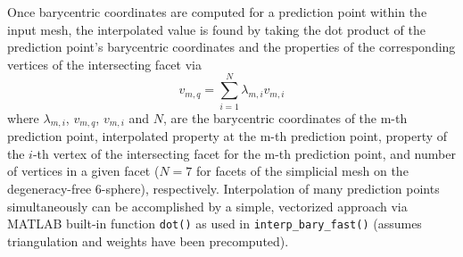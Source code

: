 \documentclass[final,twocolumn,12pt]{elsarticle}
\newcommand{\inpt}{input}
\newcommand{\outpt}{prediction}
\begin{document}
\begin{appendices}
Once barycentric coordinates are computed for a \outpt{} point within the \inpt{} mesh, the interpolated value is found by taking the dot product of the \outpt{} point's barycentric coordinates and the properties of the corresponding vertices of the intersecting facet via
\begin{equation}
\label{eq:bary-interp}
v_{m,q}=\underset{i=1}{\overset{N}{\sum }}\lambda _{m,i} v_{m,i}
\end{equation}
where $\lambda_{m,i}$, $v_{m,q}$, $v_{m,i}$ and $N$, are the barycentric coordinates of the m-th \outpt{} point, interpolated property at the m-th \outpt{} point, property of the $i$-th vertex of the intersecting facet for the m-th \outpt{} point, and number of vertices in a given facet ($N = 7$ for facets of the simplicial mesh on the degeneracy-free 6-sphere), respectively. Interpolation of many \outpt{} points simultaneously can be accomplished by a simple, vectorized approach via MATLAB built-in function \texttt{dot()} as used in \texttt{interp\_bary\_fast()} (assumes triangulation and weights have been precomputed).

\end{appendices}

\newpage
\printglossaries

\newpage


\end{document}

